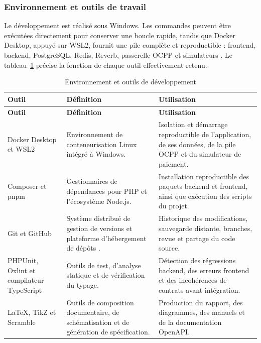 \subsubsection*{Environnement et outils de travail}

Le développement est réalisé sous Windows. Les commandes peuvent être exécutées
directement pour conserver une boucle rapide, tandis que Docker Desktop, appuyé
sur WSL2, fournit une pile complète et reproductible : frontend, backend,
PostgreSQL, Redis, Reverb, passerelle OCPP et simulateurs \cite{dockerWsl}. Le
tableau~\ref{tab:development-tools} précise la fonction de chaque outil
effectivement retenu.

\begin{longtable}{|p{3.0cm}|p{4.5cm}|p{6.5cm}|}
  \caption{Environnement et outils de développement}
  \label{tab:development-tools}\\
  \hline
  \rowcolor{ctmint}
  \textbf{Outil} & \textbf{Définition} & \textbf{Utilisation}\\\hline
  \endfirsthead
  \hline
  \rowcolor{ctmint}
  \textbf{Outil} & \textbf{Définition} & \textbf{Utilisation}\\\hline
  \endhead
  Docker Desktop et WSL2 &
  Environnement de conteneurisation Linux intégré à Windows. &
  Isolation et démarrage reproductible de l'application, de ses données, de la
  pile OCPP et du simulateur de paiement.\\\hline
  Composer et pnpm &
  Gestionnaires de dépendances pour PHP et l'écosystème Node.js. &
  Installation reproductible des paquets backend et frontend, ainsi que
  exécution des scripts du projet.\\\hline
  Git et GitHub &
  Système distribué de gestion de versions et plateforme d'hébergement de
  dépôts \cite{git,github}. &
  Historique des modifications, sauvegarde distante, branches, revue et
  partage du code source.\\\hline
  PHPUnit, Oxlint et compilateur TypeScript &
  Outils de test, d'analyse statique et de vérification du typage. &
  Détection des régressions backend, des erreurs frontend et des incohérences
  de contrats avant intégration.\\\hline
  \LaTeX, TikZ et Scramble &
  Outils de composition documentaire, de schématisation et de génération de
  spécification. &
  Production du rapport, des diagrammes, des manuels et de la documentation
  OpenAPI.\\\hline
\end{longtable}

